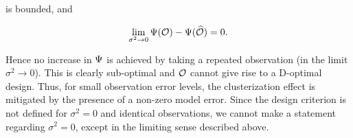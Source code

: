 is bounded, and



\begin{equation*}
\lim_{\sigma^2 \to 0} \tar(\obs) -\tar(\obsm) = 0.
\end{equation*}

Hence no increase in $\Psi$ is achieved by taking a repeated
observation (in the limit $\sigma^2 \to 0$). This is clearly
sub-optimal and $\mathcal{O}$ cannot give rise to a D-optimal design. Thus,
for small observation error levels, the clusterization effect is
mitigated by the presence of a non-zero model error. Since the design
criterion is not defined for $\sigma^2 = 0$ and identical
observations, we cannot make a statement regarding $\sigma^2 = 0$,
except in the limiting sense described above.
